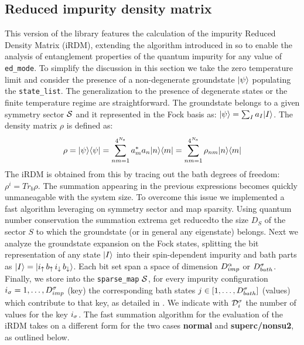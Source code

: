 \documentclass[edipack2.tex]{subfiles}
\begin{document}
\subsection{Reduced impurity density matrix}\label{sSecRDM}
This version of the \NAME library features the calculation of the
impurity Reduced Density Matrix (iRDM), extending the algorithm introduced in  so to enable the analysis of
entanglement properties of the quantum impurity for any value of {\tt
  ed\_mode}.
To simplify the discussion in this section we take the zero
temperature limit and consider the presence of a non-degenerate
groundstate $|\psi\rangle$ populating the {\tt state\_list}.
The generalization to the presence of degenerate states or the finite
temperature regime are straightforward.
The groundstate belongs to a given symmetry sector ${\cal S}$ and it
represented in the Fock basis as:  $|\psi\rangle = \sum_I a_I |I\rangle$. 
The density matrix $\rho$ is defined as:
$$
\rho = |\psi\rangle\langle \psi| = \sum_{nm=1}^{4^{N_\mathrm{s}}} a^*_ma_n |n\rangle\langle m| =\sum_{nm=1}^{4^{N_\mathrm{s}}} \rho_{nm} |n\rangle\langle m| 
$$
The iRDM is obtained from this by tracing out the bath degrees of
freedom: $\rho^{i}=Tr_{b}\rho$. The summation appearing in the
previous expressions becomes quickly unmaneagable with the system
size. To overcome this issue we implemented a fast algorithm
leveraging on symmetry sector and map sparsity.
Using quantum number conservation the summation extrema get reducedto
the size $D_S$ of the sector $S$ to which the groundstate (or in
general any eigenstate) belongs. 
Next we analyze the groundstate expansion on the Fock states, splitting the bit representation of any state $|I\rangle$ into
their spin-dependent impurity and bath parts as $|I\rangle = |
  i_\uparrow\,  b_\uparrow\, i_\downarrow \, b_\downarrow\rangle$. Each bit
set span a space of dimension $D^\alpha_{imp}$ or $D^\sigma_{bath}$. 
Finally, we store into the {\tt sparse\_map} ${\cal S}$, for every impurity configuration 
$i_\sigma =1,\dots,D^\sigma_{imp}$ (key) the corresponding bath states $j\in[1,\dots,D^\sigma_{bath}]$
(values) which contribute to that key, as detailed in
.
We indicate with ${\cal D}^\sigma_{i}$ the number of values for the key $i_\sigma$.
The fast summation algorithm for the evaluation of the iRDM takes on a
different form for the two cases {\bf normal} and {\bf superc/nonsu2},
as outlined below.
\end{document}
